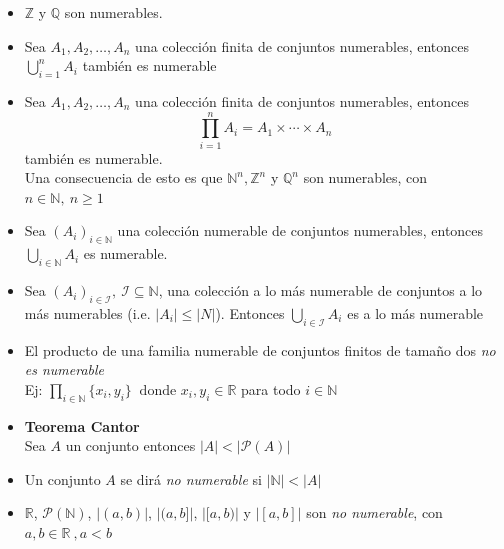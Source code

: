 \documentclass[letterpaper,11pt]{article}
\newcommand{\Q}{\mathbb Q}
\newcommand{\R}{\mathbb R}
\newcommand{\N}{\mathbb N}
\newcommand{\Z}{\mathbb Z}
\theoremstyle{plain}
\begin{document}
\begin{framed}
\begin{multicols}{2}
\begin{itemize}
    \item $\Z$ y $\Q$ son numerables.
    
    \item Sea $A_1,A_2,\dots,A_n$ una colección finita de conjuntos numerables, entonces $\displaystyle \bigcup_{i=1}^{n}A_i$ también es numerable
    
    \item Sea $A_1,A_2,\dots,A_n$ una colección finita de conjuntos numerables, entonces $$\displaystyle \prod_{i=1}^{n}A_i= A_1 \times \cdots \times A_n$$ también es numerable.\\
        Una consecuencia de esto es que $\N^n , \Z^n$ y $\Q^n$ son numerables, con $n \in \N, ~ n\geq 1$
    
    \item Sea $(A_i)_{i\in \N}$ una colección numerable de conjuntos numerables, entonces $\displaystyle \bigcup_{i\in \N}A_i$ es numerable. 
    
    \item Sea $(A_i)_{i\in \mathcal{I}}, ~\mathcal{I} \subseteq \N$, una colección a lo más numerable de conjuntos a lo más numerables (i.e. $|A_i|\leq |N|$). Entonces
    $\displaystyle \bigcup_{i\in \mathcal{I}}A_i$ es a lo más numerable
    
    \item El producto de una familia numerable de conjuntos finitos de tamaño dos \emph{no es numerable}\\
    Ej: $\displaystyle \prod_{i \in \N} \{x_i,y_i\} ~ \text{ donde } x_i,y_i \in \R$ para todo $i \in \N$
    \item \textbf{Teorema Cantor}\\Sea $A$ un conjunto entonces $|A|<|\mathcal{P}(A)|$
    \item Un conjunto $A$ se dirá \emph{no numerable}  si $|\N|<|A|$
    \item $\R$, $\mathcal{P}(\N)$, $|(a,b)|$, $|(a,b]|$, $|[a,b)|$ y $|[a,b]|$    son \emph{no numerable}, con $a,b \in \R ~,a<b$ 
        \end{itemize}
    \end{multicols}
\end{framed}
\end{document}
